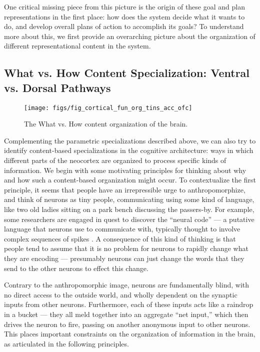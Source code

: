 \documentclass[11pt,twoside]{article}
\begin{document}
One critical missing piece from this picture is the origin of these
goal and plan representations in the first place: how does the system
decide what it wants to do, and develop overall plans of action to
accomplish its goals?  To understand more about this, we first provide
an overarching picture about the organization of different
representational content in the system.

\subsection{What vs. How Content Specialization: Ventral vs. Dorsal Pathways}

\begin{figure}
  \centering\texttt{[image: figs/fig\_cortical\_fun\_org\_tins\_acc\_ofc]}
  \caption{\small The What vs. How content organization of the brain.}
  \label{fig.what_how}
\end{figure}

Complementing the parametric specializations described above, we can
also try to identify content-based specializations in the cognitive
architecture: ways in which different parts of the neocortex are
organized to process specific kinds of information.  We begin with
some motivating principles for thinking about why and how such a
content-based organization might occur.  To contextualize the first
principle, it seems that people have an irrepressible urge to
anthropomorphize, and think of neurons as tiny people, communicating
using some kind of language, like two old ladies sitting on a park
bench discussing the passers-by.  For example, some researchers are
engaged in quest to discover the ``neural code'' --- a putative
language that neurons use to communicate with, typically thought to
involve complex sequences of spikes \cite{BialekSpikes}.  A
consequence of this kind of thinking is that people tend to assume
that it is no problem for neurons to rapidly change what they are
encoding \cite[e.g.,]{Miller00,Duncan01} --- presumably neurons can
just change the words that they send to the other neurons to effect
this change.

Contrary to the anthropomorphic image, neurons are fundamentally
blind, with no direct access to the outside world, and wholly
dependent on the synaptic inputs from other neurons.  Furthermore,
each of these inputs acts like a raindrop in a bucket --- they all
meld together into an aggregate ``net input,'' which then drives the
neuron to fire, passing on another anonymous input to other neurons.
This places important constraints on the organization of information
in the brain, as articulated in the following principles.
\end{document}
